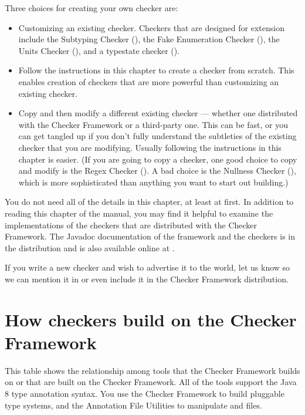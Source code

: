 Three choices for creating your own checker are:
\begin{itemize}
\item
  Customizing an existing checker.
  Checkers that are designed for extension include
  the Subtyping Checker (),
  the Fake Enumeration Checker (),
  the Units Checker (),
  and a typestate checker ().
\item
  Follow the instructions in this chapter to create a checker from scratch.
  This enables creation of checkers that are more powerful than customizing
  an existing checker.
\item
  Copy and then modify a different existing checker --- whether
  one distributed with the Checker Framework or a third-party one.
  This can be fast, or you can get tangled up if you don't fully understand
  the subtleties of the existing checker that you are modifying.
  Usually following the instructions in this chapter is easier.
  (If you are going to copy a checker, one good choice to copy and modify
  is the Regex Checker ().  A bad choice is
  the Nullness Checker (),
  which is more sophisticated than anything you want to start out building.)
\end{itemize}

You do not need all of the details in this chapter, at least at first.
In addition to reading this chapter of the manual, you may find it helpful
to examine the implementations of the checkers that are distributed with
the Checker Framework.
The Javadoc documentation of the framework and the checkers is in the
distribution and is also available online at
.

If you write a new checker and wish to advertise it to the world, let us
know so we can mention it in 
or even include it in the Checker Framework distribution.


\section{How checkers build on the Checker Framework\label{creating-tool-relationships}}

This table shows the relationship among tools that the Checker Framework
builds on or that are built on the Checker Framework.
All of the tools support the Java 8 type annotation syntax.
You use the Checker Framework to build pluggable type systems, and the
Annotation File Utilities to manipulate  and  files.

